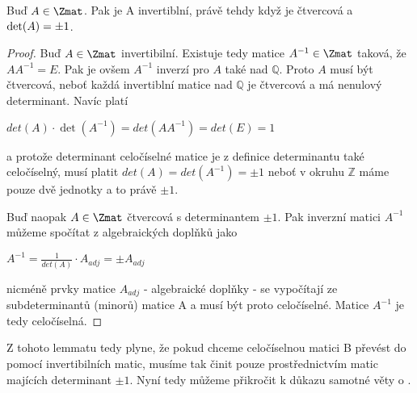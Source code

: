 \begin{lem}
    Buď $A \in \Zmat$. Pak je A invertiblní, právě tehdy když je čtvercová a
    $\textnormal{det}(A) = \pm1$.
\end{lem}
\begin{proof}
    Buď $A \in \Zmat$ invertibilní. Existuje tedy matice $A^{-1} \in \Zmat$
    taková, že $AA^{-1} = E$. Pak je ovšem $A^{-1}$ inverzí pro $A$ také nad
    $\mathbb{Q}$. Proto $A$ musí být čtvercová, neboť každá invertiblní matice
    nad $\mathbb{Q}$ je čtvercová a má nenulový determinant. Navíc platí
    \begin{center}
        $det(A) \cdot \det(A^{-1}) = det(AA^{-1}) = det(E) = 1$
    \end{center}
    a protože determinant celočíselné matice je z definice determinantu
    také celočíselný, musí platit $det(A) = det(A^{-1}) = \pm1$ neboť v okruhu
    $\mathbb{Z}$ máme pouze dvě jednotky a to právě $\pm1$.

    Buď naopak  $A \in \Zmat$ čtvercová s determinantem $\pm1$. Pak inverzní
    matici $A^{-1}$ můžeme spočítat z algebraických doplňků jako
    \begin{center}
        $A^{-1} = \frac{1}{det(A)} \cdot A_{adj} = \pm A_{adj}$
    \end{center}
    nicméně prvky matice $A_{adj}$ - algebraické doplňky - se vypočítají
    ze subdeterminantů (minorů) matice A a musí být proto celočíselné. Matice
    $A^{-1}$ je tedy celočíselná.
\end{proof}

Z tohoto lemmatu tedy plyne, že pokud chceme celočíselnou matici B převést do
\snf pomocí invertibilních matic, musíme tak činit pouze prostřednictvím
matic majících determinant $\pm1$. Nyní tedy můžeme přikročit k důkazu samotné
věty o \snf.

